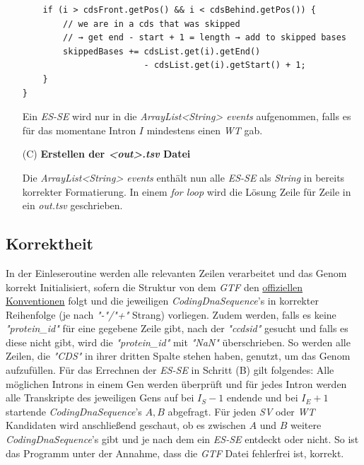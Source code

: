 \documentclass[12pt]{article}
\begin{document}
\begin{enumerate}
\begin{verbatim}
    if (i > cdsFront.getPos() && i < cdsBehind.getPos()) {
        // we are in a cds that was skipped
        // → get end - start + 1 = length → add to skipped bases
        skippedBases += cdsList.get(i).getEnd() 
                        - cdsList.get(i).getStart() + 1;
    }
}
    \end{verbatim}
		Ein \textit{ES-SE} wird nur in die \textit{ArrayList<String> events} aufgenommen, falls es für das momentane
		Intron $I$ mindestens einen \textit{WT} gab.

	\item[(C)] \textbf{Erstellen der \textit{<out>.tsv} Datei}

		Die \textit{ArrayList<String> events} enthält nun alle \textit{ES-SE} als \textit{String} in bereits
		korrekter Formatierung. In einem \textit{for loop} wird die Lösung Zeile für Zeile in ein \textit{out.tsv}
		geschrieben.
\end{enumerate}

\subsection{Korrektheit}
In der Einleseroutine werden alle relevanten Zeilen verarbeitet und das Genom
korrekt Initialisiert, sofern die Struktur von dem \textit{GTF} den \href{https://asia.ensembl.org/info/website/upload/gff.html}{offiziellen Konventionen} folgt und die jeweiligen
\textit{CodingDnaSequence}'s in korrekter Reihenfolge (je nach \textit{"-"/"+"} Strang) vorliegen.
Zudem werden, falls es keine \textit{"protein\_id"} für eine gegebene Zeile gibt, nach der
\textit{"ccdsid"} gesucht und falls es diese nicht gibt, wird die \textit{"protein\_id"}
mit \textit{"NaN"} überschrieben. So werden alle Zeilen, die \textit{"CDS"} in ihrer
dritten Spalte stehen haben, genutzt, um das Genom aufzufüllen.
Für das Errechnen der \textit{ES-SE} in Schritt (B) gilt folgendes:
Alle möglichen Introns in einem Gen werden überprüft und für jedes Intron
werden alle Transkripte des jeweiligen Gens auf bei $I_{S} - 1$ endende  und
bei $I_{E} + 1$ startende \textit{CodingDnaSequence}'s $A, B$ abgefragt. Für
jeden \textit{SV} oder \textit{WT} Kandidaten wird anschlie\ss end geschaut,
ob es zwischen $A$ und $B$ weitere \textit{CodingDnaSequence}'s gibt und
je nach dem ein \textit{ES-SE} entdeckt oder nicht.
So ist das Programm unter der Annahme, dass die \textit{GTF} Datei fehlerfrei ist, korrekt.
\end{document}
